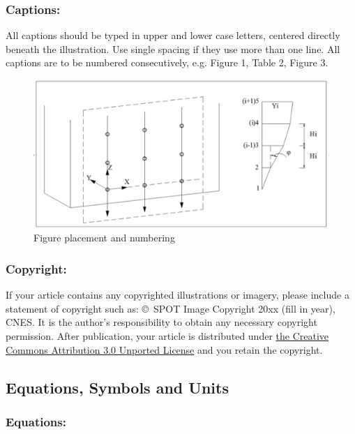 \documentclass{isprs}
\begin{document}
\subsubsection{Captions:}\label{sec:Captions}

All captions should be typed in upper and lower case letters, 
centered directly beneath the illustration. Use single spacing if they 
use more than one line. All captions are to be numbered consecutively, 
e.g. Figure 1, Table 2, Figure 3.

\begin{figure}[h!]
\begin{center}
		\includegraphics[width=1.0\columnwidth]{figures/test_sites/fig1.eps}
	\caption{Figure placement and numbering}
	\label{fig:figure_placement}
\end{center}
\end{figure}


\subsubsection{Copyright:}\label{sec:Copyright}

If your article contains any copyrighted illustrations or imagery, 
please include a statement of copyright such as: \copyright~SPOT Image Copyright 20xx 
(fill in year), CNES. It is the author's responsibility to obtain any necessary 
copyright permission. After publication, your article is distributed under \underline{the Creative 
Commons Attribution 3.0 Unported License} and you retain the copyright.


\subsection{Equations, Symbols and Units}\label{sec:Equations, Symbols and Units}

\subsubsection{Equations:}\label{sec:Equations}
\end{document}
